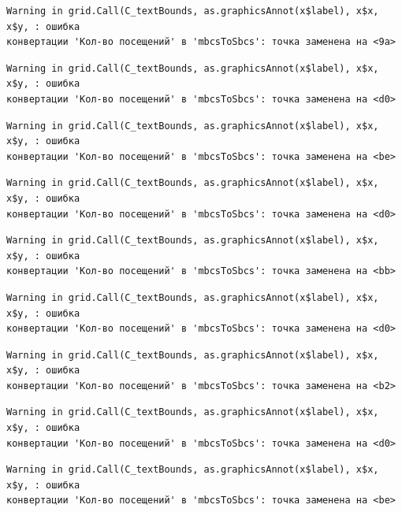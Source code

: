 \documentclass[
  letterpaper,
  DIV=11,
  numbers=noendperiod]{scrreprt}
\begin{document}
\begin{verbatim}
Warning in grid.Call(C_textBounds, as.graphicsAnnot(x$label), x$x, x$y, : ошибка
конвертации 'Кол-во посещений' в 'mbcsToSbcs': точка заменена на <9a>
\end{verbatim}

\begin{verbatim}
Warning in grid.Call(C_textBounds, as.graphicsAnnot(x$label), x$x, x$y, : ошибка
конвертации 'Кол-во посещений' в 'mbcsToSbcs': точка заменена на <d0>
\end{verbatim}

\begin{verbatim}
Warning in grid.Call(C_textBounds, as.graphicsAnnot(x$label), x$x, x$y, : ошибка
конвертации 'Кол-во посещений' в 'mbcsToSbcs': точка заменена на <be>
\end{verbatim}

\begin{verbatim}
Warning in grid.Call(C_textBounds, as.graphicsAnnot(x$label), x$x, x$y, : ошибка
конвертации 'Кол-во посещений' в 'mbcsToSbcs': точка заменена на <d0>
\end{verbatim}

\begin{verbatim}
Warning in grid.Call(C_textBounds, as.graphicsAnnot(x$label), x$x, x$y, : ошибка
конвертации 'Кол-во посещений' в 'mbcsToSbcs': точка заменена на <bb>
\end{verbatim}

\begin{verbatim}
Warning in grid.Call(C_textBounds, as.graphicsAnnot(x$label), x$x, x$y, : ошибка
конвертации 'Кол-во посещений' в 'mbcsToSbcs': точка заменена на <d0>
\end{verbatim}

\begin{verbatim}
Warning in grid.Call(C_textBounds, as.graphicsAnnot(x$label), x$x, x$y, : ошибка
конвертации 'Кол-во посещений' в 'mbcsToSbcs': точка заменена на <b2>
\end{verbatim}

\begin{verbatim}
Warning in grid.Call(C_textBounds, as.graphicsAnnot(x$label), x$x, x$y, : ошибка
конвертации 'Кол-во посещений' в 'mbcsToSbcs': точка заменена на <d0>
\end{verbatim}

\begin{verbatim}
Warning in grid.Call(C_textBounds, as.graphicsAnnot(x$label), x$x, x$y, : ошибка
конвертации 'Кол-во посещений' в 'mbcsToSbcs': точка заменена на <be>
\end{verbatim}
\end{document}
